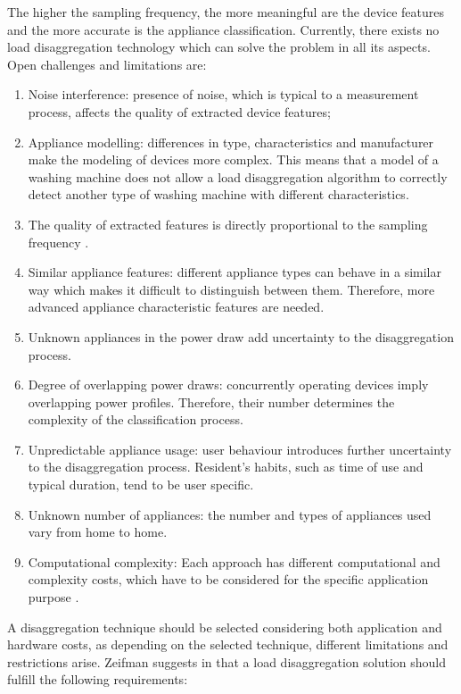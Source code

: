 \documentclass{article}
\begin{document}
The higher the sampling frequency, the more meaningful are the device features and the more accurate is the appliance classification.
Currently, there exists no load disaggregation technology which can solve the problem in all its aspects. Open challenges and limitations are:\begin{enumerate}
  \item Noise interference: presence of noise, which is typical to a measurement process,  affects the quality of extracted device features;
  \item Appliance modelling: differences in type, characteristics and manufacturer make the modeling of devices more complex. This means that a model of a washing machine does not allow a load disaggregation algorithm to correctly detect another type of washing machine with different characteristics.
  \item The quality of extracted features is directly proportional to the sampling frequency \cite{CarrieArmel2013}.  \item Similar appliance features: different appliance types can behave in a similar way which makes it difficult to distinguish between them.
  Therefore, more advanced appliance characteristic features are needed.
  \item Unknown appliances in the power draw add uncertainty to the disaggregation process.
  \item Degree of overlapping power draws: concurrently operating devices imply overlapping power profiles. Therefore, their number determines the complexity of the classification process.
\item Unpredictable appliance usage: user behaviour introduces further uncertainty to the disaggregation process. Resident's habits, such as time of use and typical duration, tend to be user specific.
\item Unknown number of appliances: the number and types of appliances used vary from home to home.
  \item Computational complexity: Each approach has different computational and complexity costs, which have to be considered for the specific application purpose \cite{MakoninPG13}.
\end{enumerate}
A disaggregation technique should be selected considering both application and hardware costs, as depending on the selected technique, different limitations and restrictions arise. Zeifman suggests in \cite{Zeifman2012} that a load disaggregation solution should fulfill the following requirements:
\end{document}
